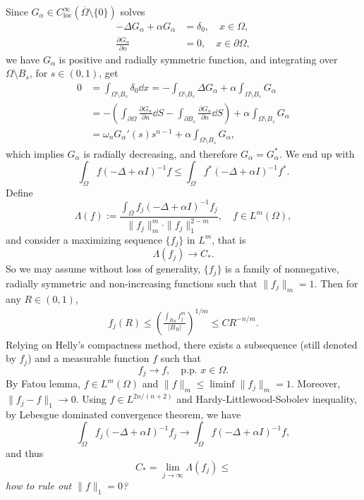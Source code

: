 Since $G_\alpha\in C^{\infty}_{\mathrm{loc}}(\overline{\Omega}\setminus\{0\})$ solves
\begin{align*}
	-\Delta G_\alpha + \alpha G_\alpha &= \delta_0, \quad x\in\Omega,\\
	\frac{\partial G_\alpha}{\partial n} &= 0,\quad x\in\partial\Omega,
\end{align*}
we have $G_\alpha$ is positive and radially symmetric function, 
and integrating over $\Omega\setminus B_s$, for $s\in(0,1)$, get 
\begin{align*}
	0 &= \int_{\Omega\setminus B_s} \delta_0\dd x 
		= - \int_{\Omega\setminus B_s} \Delta G_\alpha + \alpha\int_{\Omega\setminus B_s} G_\alpha\\
		&= -\left(\int_{\partial\Omega}\frac{\partial G_\alpha}{\partial n}\dd S 
			- \int_{\partial B_s}\frac{\partial G_\alpha}{\partial n}\dd S\right) 
			+ \alpha\int_{\Omega\setminus B_s} G_\alpha\\
		&= \omega_n G_\alpha'(s)s^{n-1} + \alpha\int_{\Omega\setminus B_s} G_\alpha,
\end{align*}  
which implies $G_\alpha$ is radially decreasing, and therefore $G_\alpha = G_\alpha^\ast$.
We end up with 
\[
\int_\Omega f(-\Delta + \alpha I)^{-1}f\leq \int_\Omega f^\ast(-\Delta +\alpha I)^{-1}f^\ast.
\]
Define 
\[
\Lambda(f) := \frac{\int_\Omega f_j(-\Delta + \alpha I)^{-1}f_j}{\|f_j\|_m^m\cdot\|f_j\|_1^{2-m}},
	\quad f\in L^m(\Omega),
\]
and consider a maximizing sequence $\{f_j\}$ in $L^m$, that is
\[
\Lambda(f_j) \to C_\ast.
\]
So we may assume without loss of generality,
$\{f_j\}$ is a family of nonnegative, radially symmetric and non-increasing functions such that $\|f_j\|_m=1$. 
Then for any $R\in(0,1)$,
\begin{align*}
	f_j(R) \leq \left(\frac{\int_{B_R}f_j^m}{|B_R|}\right)^{1/m}
		\leq CR^{-n/m}.
\end{align*}
Relying on Helly's compactness method, there exists a subsequence (still denoted by $f_j$) 
and a measurable function $f$ such that 
\[
f_j \to f, \quad \text{p.p. } x\in\Omega.
\]
By Fatou lemma, $f\in L^m(\Omega)$ and $\|f\|_m\leq\liminf\|f_j\|_m = 1$. 
Moreover, $\|f_j-f\|_1 \to 0$.
Using $f\in L^{2n/(n+2)}$ and Hardy-Littlewood-Sobolev inequality, by Lebesgue dominated convergence theorem,
we have 
\[
\int_\Omega f_j(-\Delta + \alpha I)^{-1}f_j \to \int_\Omega f (-\Delta + \alpha I)^{-1}f,
\]
and thus 
\[
C_\ast = \lim_{j\to\infty}\Lambda(f_j) \leq 
\]
\emph{how to rule out $\|f\|_1 = 0$?}


